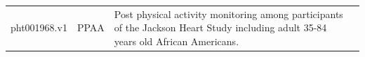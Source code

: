 \documentclass[11pt]{article}
\begin{document}
\begin{tabular}{r|lll}
	 pht001968.v1                                                                                                                                                                                                                                                                                                                                                                                                                                                                                                                                                                                                                                                                                                                                                                                                                                                                                                                                                                                  & PPAA                                                                                                                                                                                                                                                                                                                                                                                                                                                                                                                                                                                                                                                                                                                                                                                                                                                                                                                                                                                          & Post physical activity monitoring among participants of the Jackson Heart Study including adult 35-84 years old African Americans.                                                                                                                                                                                                                                                                                                                                                                                                                                                                                                                                                                                                                                                                                                                                                                                                                                                           \\

\end{tabular}
\end{document}
